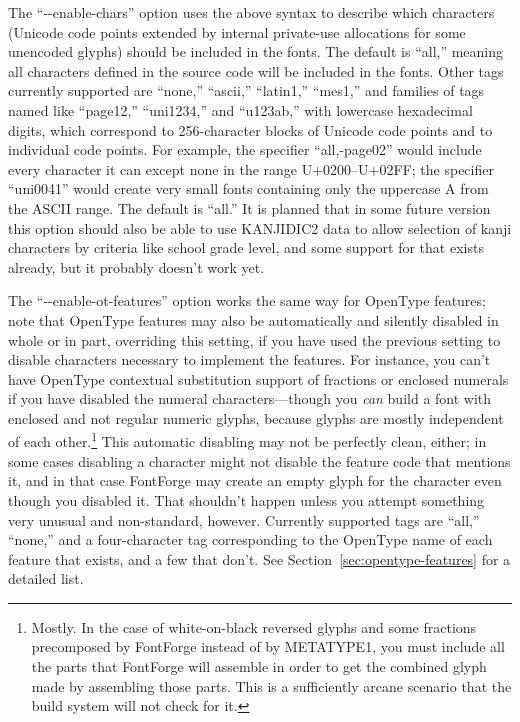 \documentclass[14pt]{extarticle}
\begin{document}
The ``-{}-enable-chars'' option uses the above syntax to describe which
characters (Unicode code points extended by internal private-use allocations
for some unencoded glyphs) should be included in the fonts.  The default is
``all,'' meaning all characters defined in the source code will be included
in the fonts.  Other tags currently supported are ``none,'' ``ascii,''
``latin1,'' ``mes1,'' and families of tags named like ``page12,''
``uni1234,'' and ``u123ab,'' with lowercase hexadecimal digits, which
correspond to 256-character blocks of Unicode code points and to individual
code points.  For example, the specifier ``all,-page02'' would include every
character it can except none in the range U+0200--U+02FF; the specifier
``uni0041'' would create very small fonts containing only the uppercase A
from the ASCII range.  The default is ``all.'' It is planned that in some
future version this option should also be able to use KANJIDIC2 data to
allow selection of kanji characters by criteria like school grade level, and
some support for that exists already, but it probably doesn't work yet.

The ``-{}-enable-ot-features'' option works the same way for OpenType
features; note that OpenType features may also be automatically and silently
disabled in whole or in part, overriding this setting, if you have used the
previous setting to disable characters necessary to implement the features. 
For instance, you can't have OpenType contextual substitution support of
fractions or enclosed numerals if you have disabled the numeral
characters---though you \emph{can} build a font with enclosed and not
regular numeric glyphs, because glyphs are mostly independent of each
other.\footnote{Mostly.  In the case of white-on-black reversed glyphs and
some fractions precomposed by FontForge instead of by METATYPE1, you
must include all the parts that FontForge will assemble in order to get the
combined glyph made by assembling those parts.  This is a sufficiently
arcane scenario that the build system will not check for it.}
This automatic disabling may not be perfectly clean, either; in some cases
disabling a character might not disable the feature code that mentions it,
and in that case FontForge may create an empty glyph for the character even
though you disabled it.  That shouldn't happen unless you attempt something
very unusual and non-standard, however. Currently supported tags are
``all,'' ``none,'' and a four-character tag corresponding to the OpenType
name of each feature that exists, and a few that don't.  See
Section~\ref{sec:opentype-features} for a detailed list.
\end{document}
